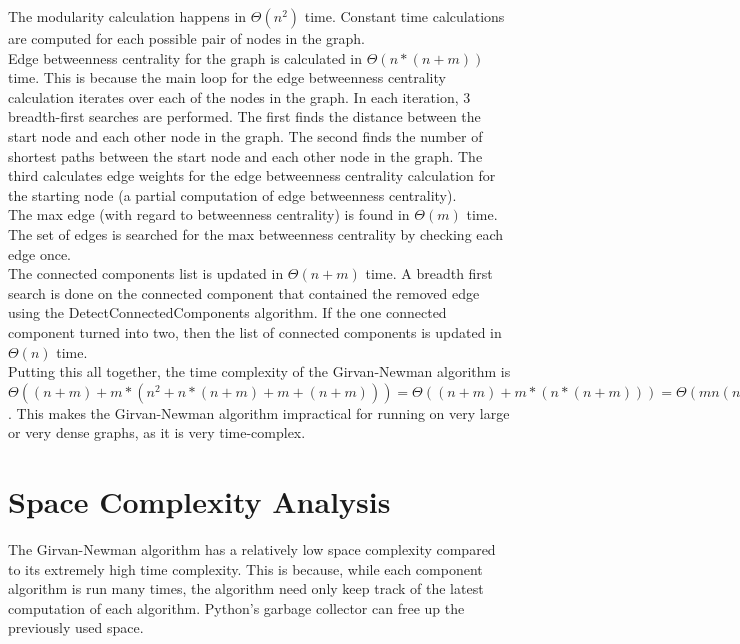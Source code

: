 \documentclass{article}
\begin{document}
The modularity calculation happens in $\Theta(n^2)$ time.  Constant time calculations are computed for each possible pair of nodes in the graph. \\

Edge betweenness centrality for the graph is calculated in $\Theta(n*(n + m))$ time.  This is because the main loop for the edge betweenness centrality calculation iterates over each of the nodes in the graph.  In each iteration, 3 breadth-first searches are performed.  The first finds the distance between the start node and each other node in the graph.  The second finds the number of shortest paths between the start node and each other node in the graph.  The third calculates edge weights for the edge betweenness centrality calculation for the starting node (a partial computation of edge betweenness centrality). \\

The max edge (with regard to betweenness centrality) is found in $\Theta(m)$ time.  The set of edges is searched for the max betweenness centrality by checking each edge once. \\

The connected components list is updated in $\Theta(n + m)$ time.  A breadth first search is done on the connected component that contained the removed edge using the DetectConnectedComponents algorithm.  If the one connected component turned into two, then the list of connected components is updated in $\Theta(n)$ time. \\

Putting this all together, the time complexity of the Girvan-Newman algorithm is $\Theta((n + m) + m*(n^2 + n*(n + m) + m + (n + m))) = \Theta((n + m) + m*(n*(n + m))) = \Theta(mn(n + m))$.  This makes the Girvan-Newman algorithm impractical for running on very large or very dense graphs, as it is very time-complex. \\


\section{Space Complexity Analysis}

The  Girvan-Newman algorithm has a relatively low space complexity compared to its extremely high time complexity.  This is because, while each component algorithm is run many times, the algorithm need only keep track of the latest computation of each algorithm.  Python's garbage collector can free up the previously used space. \\
\end{document}
